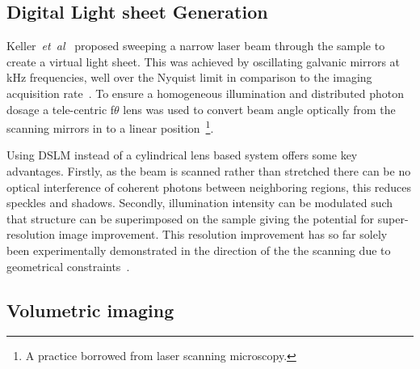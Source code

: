 \subsection{Digital Light sheet Generation}

Keller~\emph{et~al}~\cite{keller_quantitative_2008} proposed sweeping a narrow laser beam through the sample to create a virtual light sheet.
This was achieved by oscillating galvanic mirrors at kHz frequencies, well over the Nyquist limit in comparison to the imaging acquisition rate~\cite{keller_quantitative_2008}.
To ensure a homogeneous illumination and distributed photon dosage a tele-centric f$\theta$ lens was used to convert beam angle optically from the scanning mirrors in to a linear position~\footnote{A practice borrowed from laser scanning microscopy.}.

Using DSLM instead of a cylindrical lens based system offers some key advantages.
Firstly, as the beam is scanned rather than stretched there can be no optical interference of coherent photons between neighboring regions, this reduces speckles and shadows.
Secondly, illumination intensity can be modulated such that structure can be superimposed on the sample giving the potential for super-resolution image improvement.
This resolution improvement has so far solely been experimentally demonstrated in the direction of the the scanning due to geometrical constraints~\cite{chen_lattice_2014}.

\subsection{Volumetric imaging}

